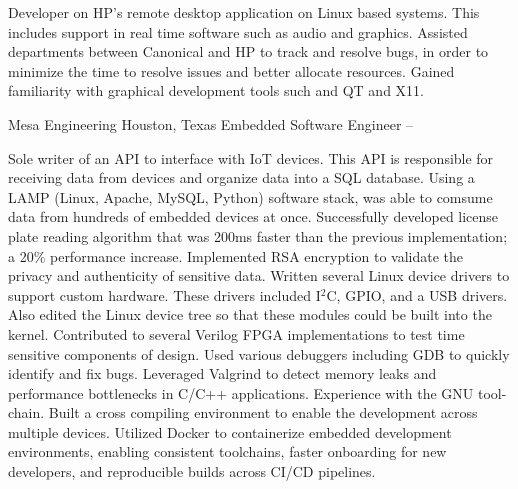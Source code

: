 \documentclass[letterpaper,MMMyyyy,nonstopmode]{simpleresumecv}
\begin{document}
\begin{Body}
    \begin{Detail}
        \BulletItem
        Developer on HP's remote desktop application on Linux based systems. This includes support in real time software such as audio and graphics.
        \vspace{1mm} %
        \BulletItem
        Assisted departments between Canonical and HP to track and resolve bugs, in order to minimize the time to resolve issues and better allocate resources.
        \vspace{1mm} %
        \BulletItem
        Gained familiarity with graphical development tools such and QT and X11.
        \vspace{1mm} %
    \end{Detail}
    \vspace{3mm} %

    \SubSection
    {Mesa Engineering}
    {Houston, Texas}
    {Embedded Software Engineer}
    { -- }

    \begin{Detail}
        \BulletItem
        Sole writer of an API to interface with IoT devices. This API is responsible for receiving data from devices and organize data into a SQL database. Using a LAMP (Linux, Apache, MySQL, Python) software stack, was able to comsume data from hundreds of embedded devices at once.
        \vspace{1mm} %
        \BulletItem
        Successfully developed license plate reading algorithm that was 200ms faster than the previous implementation; a 20\% performance increase.
        \vspace{1mm} %
        \BulletItem
        Implemented RSA encryption to validate the privacy and authenticity of sensitive data.
        \BulletItem
        Written several Linux device drivers to support custom hardware. These drivers included I$^2$C, GPIO, and a USB drivers. Also edited the Linux device tree so that these modules could be built into the kernel.
        \vspace{1mm} %
        \BulletItem
        Contributed to several Verilog FPGA implementations to test time sensitive components of design.
        \vspace{1mm} %
        \BulletItem
        Used various debuggers including GDB to quickly identify and fix bugs. Leveraged Valgrind to detect memory leaks and performance bottlenecks in C/C++ applications.
        \vspace{1mm} %
        \BulletItem
        Experience with the GNU tool-chain. Built a cross compiling environment to enable the development across multiple devices.
        \vspace{1mm} %
        \BulletItem
        Utilized Docker to containerize embedded development environments, enabling consistent toolchains, faster onboarding for new developers, and reproducible builds across CI/CD pipelines.
        \vspace{1mm} %
    \end{Detail}


\end{Body}
\end{document}
